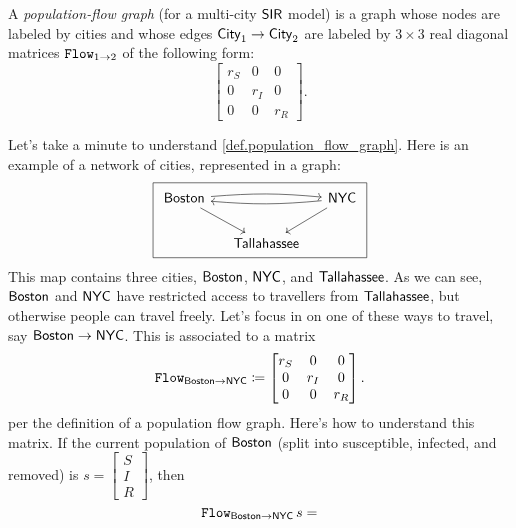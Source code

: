 \documentclass[DynamicalBook]{subfiles}
\begin{document}
\begin{definition}\label{def.population_flow_graph}
  A \emph{population-flow graph} (for a multi-city $\mathsf{SIR}$ model) is a graph
  whose nodes are labeled by cities and whose edges $\mathsf{City}_1 \to
  \mathsf{City}_2$ are labeled by
  $3 \times 3$ real diagonal matrices $\mathtt{Flow}_{1\to
    2}$ of the following form:
  \[
\begin{bmatrix} 
  r_S & 0 & 0 \\
  0 & r_I & 0 \\
  0 & 0 & r_R 
\end{bmatrix}.
\]

\end{definition}

\begin{example}\label{ex.population_flow_graph}
Let's take a minute to understand \cref{def.population_flow_graph}. Here is an
example of a network of cities, represented in a graph:
\begin{equation}\label{eqn.population_flow_graph}
\begin{tikzpicture}
	\node[draw] {
  \begin{tikzcd}[column sep=small]
    \Sys{Boston} \ar[rr, bend left=5]\ar[rr, bend right=5, leftarrow] \ar[dr] &  & \ar[dl]\Sys{NYC}\\
& \Sys{Tallahassee} &
  \end{tikzcd}
  };
\end{tikzpicture}
\end{equation}
This map contains three cities, $\mathsf{Boston}$, $\mathsf{NYC}$, and
$\mathsf{Tallahassee}$. As we can see, $\mathsf{Boston}$ and $\mathsf{NYC}$ have
restricted access to travellers from $\mathsf{Tallahassee}$, but otherwise people
can travel freely. Let's focus in on one of these ways to travel, say
$\mathsf{Boston} \to \mathsf{NYC}$. This is associated to a matrix
\[
\mathtt{Flow}_{\mathsf{Boston} \to \mathsf{NYC}} \coloneqq
\begin{bmatrix} 
  r_S & 0 & 0 \\
  0 & r_I & 0 \\
  0 & 0 & r_R 
\end{bmatrix}.
\]
per the definition of a population flow graph. Here's how to understand this
matrix. If the current population of $\mathsf{Boston}$ (split into susceptible,
infected, and removed) is $s = \begin{bmatrix}S \\ I \\ R\end{bmatrix}$, then 
\[
  \mathtt{Flow}_{\mathsf{Boston} \to \mathsf{NYC}}\, s = 
\]
\end{example}
\end{document}
